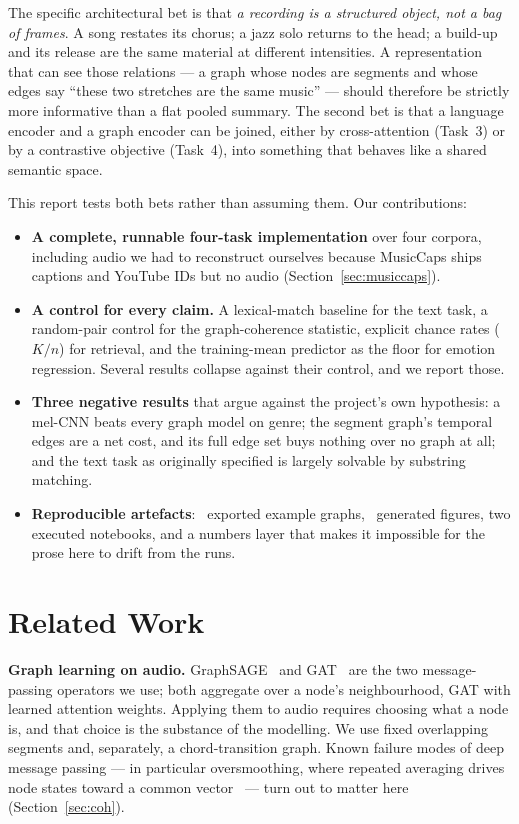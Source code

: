 \documentclass[10pt,a4paper]{article}
\begin{document}
The specific architectural bet is that \emph{a recording is a structured object,
not a bag of frames}. A song restates its chorus; a jazz solo returns to the
head; a build-up and its release are the same material at different intensities.
A representation that can see those relations --- a graph whose nodes are
segments and whose edges say ``these two stretches are the same music'' ---
should therefore be strictly more informative than a flat pooled summary. The
second bet is that a language encoder and a graph encoder can be joined, either
by cross-attention (Task~3) or by a contrastive objective (Task~4), into
something that behaves like a shared semantic space.

This report tests both bets rather than assuming them. Our contributions:

\begin{itemize}\itemsep2pt
\item \textbf{A complete, runnable four-task implementation} over four corpora,
      including audio we had to reconstruct ourselves because MusicCaps ships
      captions and YouTube IDs but no audio (Section~\ref{sec:musiccaps}).
\item \textbf{A control for every claim.} A lexical-match baseline for the text
      task, a random-pair control for the graph-coherence statistic, explicit
      chance rates ($K/n$) for retrieval, and the training-mean predictor as the
      floor for emotion regression. Several results collapse against their
      control, and we report those.
\item \textbf{Three negative results} that argue against the project's own
      hypothesis: a mel-CNN beats every graph model on genre; the segment graph's
      temporal edges are a net cost, and its full edge set buys nothing over no
      graph at all; and the text task as originally
      specified is largely solvable by substring matching.
\item \textbf{Reproducible artefacts}: \nExportedGraphs\ exported example graphs,
      \nFigures\ generated figures, two executed notebooks, and a numbers layer
      that makes it impossible for the prose here to drift from the runs.
\end{itemize}

\section{Related Work}
\textbf{Graph learning on audio.} GraphSAGE~\cite{hamilton2017} and
GAT~\cite{velickovic2018} are the two message-passing operators we use; both
aggregate over a node's neighbourhood, GAT with learned attention weights.
Applying them to audio requires choosing what a node is, and that choice is the
substance of the modelling. We use fixed overlapping segments and, separately, a
chord-transition graph. Known failure modes of deep message passing --- in
particular oversmoothing, where repeated averaging drives node states toward a
common vector~\cite{li2018} --- turn out to matter here (Section~\ref{sec:coh}).
\end{document}
